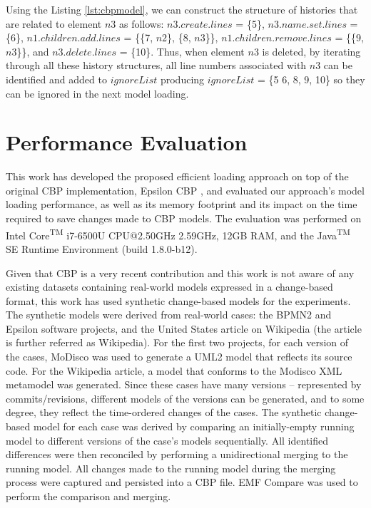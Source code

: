 {Using the Listing \ref{lst:cbpmodel}, we can construct the structure of histories that are related to element $n3$ as follows: $n3$.$create$.$lines$ = \{5\}, $n3$.$name$.$set$.$lines$ = \{6\}, $n1$.$children$.$add$.$lines$ = \{\{7, $n2$\}, \{8, $n3$\}\}, $n1$.$children$.$remove$.$lines$ = \{\{9, $n3$\}\}, and $n3$.$delete$.$lines$ = \{10\}. Thus, when element $n3$ is deleted, by iterating through all these history structures, all line numbers associated with $n3$ can be identified and added to $ignoreList$ producing $ignoreList$ = \{5 6, 8, 9, 10\} so they can be ignored in the next model loading.

\section{Performance Evaluation}
\label{sec:performance_evaluation}

This work has developed the proposed efficient loading approach on top of the original CBP implementation, Epsilon CBP \cite{DBLP:conf/models/YohannisKP17,epsilonlabs2019emfcbp}, and evaluated our approach's model loading performance, as well as its memory footprint and its impact on the time required to save changes made to CBP models. The evaluation was performed on Intel\textsuperscript{\textregistered} Core\textsuperscript{TM} i7-6500U CPU@2.50GHz 2.59GHz, 12GB RAM, and the Java\textsuperscript{TM} SE Runtime Environment (build 1.8.0-b12).

Given that CBP is a very recent contribution and this work is not aware of any existing datasets containing real-world models expressed in a change-based format, this work has used synthetic change-based models for the experiments. The synthetic models were derived from real-world cases: the BPMN2 \cite{eclipse2017bpmn2,eclipse2018bpmn2git} and Epsilon \cite{eclipse2017epsilon,eclipse2018epsilongit} software projects, and the United States article \cite{wikipedia2018us} on Wikipedia (the article is further referred as Wikipedia). For the first two projects, for each version of the cases, MoDisco \cite{DBLP:journals/infsof/BruneliereCDM14} was used to generate a UML2 \cite{eclipse2017uml2} model that reflects its source code. For the Wikipedia article, a model that conforms to the Modisco XML metamodel \cite{eclipse2018modiscoxml} was generated. Since these cases have many versions -- represented by commits/revisions, different models of the versions can be generated, and to some degree, they reflect the time-ordered changes of the cases. The synthetic change-based model for each case was derived by comparing an initially-empty running model to different versions of the case's models sequentially. All identified differences were then reconciled by performing a unidirectional merging to the running model. All changes made to the running model during the merging process were captured and persisted into a CBP file. EMF Compare was used \cite{eclipse2017compare} to perform the comparison and merging.

}
